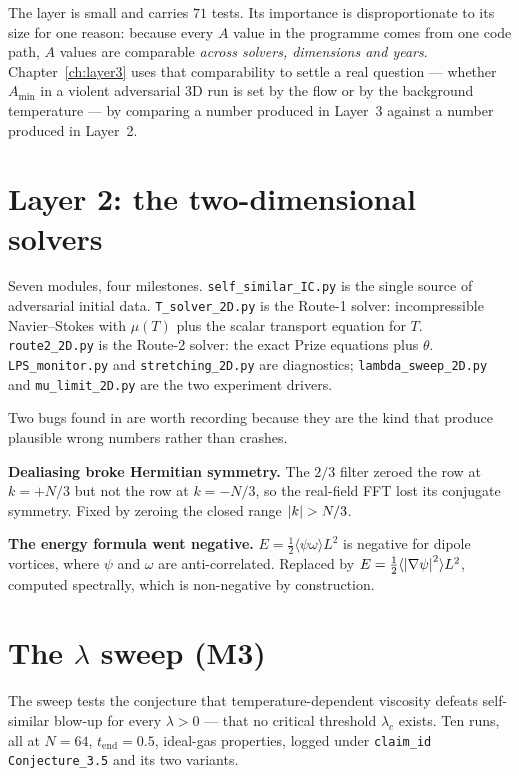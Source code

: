 The layer is small and carries \(71\) tests. Its importance is
disproportionate to its size for one reason: because every \(A\) value in the
programme comes from one code path, \(A\) values are comparable \emph{across
solvers, dimensions and years}. Chapter~\ref{ch:layer3} uses that
comparability to settle a real question --- whether \(A_{\min}\) in a violent
adversarial 3D run is set by the flow or by the background temperature --- by
comparing a number produced in Layer~3 against a number produced in Layer~2.

\section{Layer 2: the two-dimensional solvers}
\label{sec:layer2}

Seven modules, four milestones. \texttt{self\_similar\_IC.py} is the single
source of adversarial initial data. \texttt{T\_solver\_2D.py} is the Route-1
solver: incompressible Navier--Stokes with \(\mu(T)\) plus the scalar
transport equation for \(T\). \texttt{route2\_2D.py} is the Route-2 solver:
the exact Prize equations plus \(\theta\). \texttt{LPS\_monitor.py} and
\texttt{stretching\_2D.py} are diagnostics; \texttt{lambda\_sweep\_2D.py} and
\texttt{mu\_limit\_2D.py} are the two experiment drivers.

Two bugs found in  are worth recording because they are the kind that
produce plausible wrong numbers rather than crashes.

\begin{record}
\textbf{Dealiasing broke Hermitian symmetry.} The \(2/3\) filter zeroed the
row at \(k=+N/3\) but not the row at \(k=-N/3\), so the real-field FFT lost
its conjugate symmetry. Fixed by zeroing the closed range \(\abs{k}>N/3\).

\smallskip
\textbf{The energy formula went negative.} \(E=\tfrac12\langle\psi\omega\rangle
L^2\) is negative for dipole vortices, where \(\psi\) and \(\omega\) are
anti-correlated. Replaced by \(E=\tfrac12\langle\left|\nabla\psi\right|^2\rangle L^2\),
computed spectrally, which is non-negative by construction.
\end{record}

\section{The \texorpdfstring{\(\lambda\)}{lambda} sweep (M3)}
\label{sec:lambda-sweep}

The sweep tests the conjecture that temperature-dependent viscosity defeats
self-similar blow-up for every \(\lambda>0\) --- that no critical threshold
\(\lambda_c\) exists. Ten runs, all at \(N=64\), \(t_{\mathrm{end}}=0.5\),
ideal-gas properties, logged under \texttt{claim\_id} \texttt{Conjecture\_3.5}
and its two variants.

